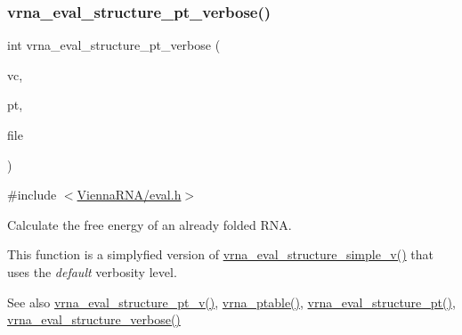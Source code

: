 \subsubsection{\texorpdfstring{vrna\_eval\_structure\_pt\_verbose()}{vrna\_eval\_structure\_pt\_verbose()}}
{\footnotesize\ttfamily int vrna\+\_\+eval\+\_\+structure\+\_\+pt\+\_\+verbose (\begin{DoxyParamCaption}\item[{\mbox{\hyperlink{group__fold__compound_ga1b0cef17fd40466cef5968eaeeff6166}{vrna\+\_\+fold\+\_\+compound\+\_\+t}} $\ast$}]{vc,  }\item[{const short $\ast$}]{pt,  }\item[{F\+I\+LE $\ast$}]{file }\end{DoxyParamCaption})}



{\ttfamily \#include $<$\mbox{\hyperlink{eval_8h}{Vienna\+R\+N\+A/eval.\+h}}$>$}



Calculate the free energy of an already folded R\+NA. 

This function is a simplyfied version of \mbox{\hyperlink{group__eval_gacd6278343e77d13f1d53588e50d303bc}{vrna\+\_\+eval\+\_\+structure\+\_\+simple\+\_\+v()}} that uses the {\itshape default} verbosity level.

\begin{DoxySeeAlso}{See also}
\mbox{\hyperlink{group__eval_ga2c6533ba0afe4c88d335d8f1e0e2a48e}{vrna\+\_\+eval\+\_\+structure\+\_\+pt\+\_\+v()}}, \mbox{\hyperlink{group__struct__utils__pair__table_gae829fb8bb7f694c12a9c0bbc34c77c60}{vrna\+\_\+ptable()}}, \mbox{\hyperlink{group__eval_gadbd09372ddfd7a450bbd590c96a6bfe4}{vrna\+\_\+eval\+\_\+structure\+\_\+pt()}}, \mbox{\hyperlink{group__eval_ga0928d699d310178f84ee2351034e5cb5}{vrna\+\_\+eval\+\_\+structure\+\_\+verbose()}}
\end{DoxySeeAlso}

